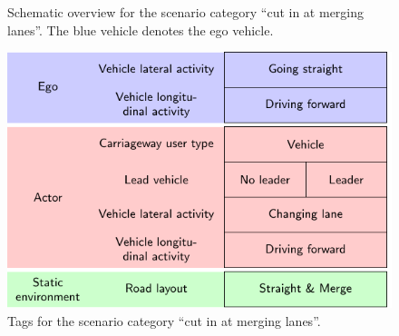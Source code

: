 \setlength{\figurewidth}{22.5em}
\begin{figure}[t]
	\centering
	
	\caption{Schematic overview for the scenario category ``cut in at merging lanes''. The blue vehicle denotes the ego vehicle.}
	\label{fig:scheme cut in}		
\end{figure}
\begin{figure}[t]
	\centering
	\includegraphics[width=\linewidth]{figures/cut-in_tags}
	\caption{Tags for the scenario category ``cut in at merging lanes''.}
	\label{fig:tags cut in}
\end{figure}



